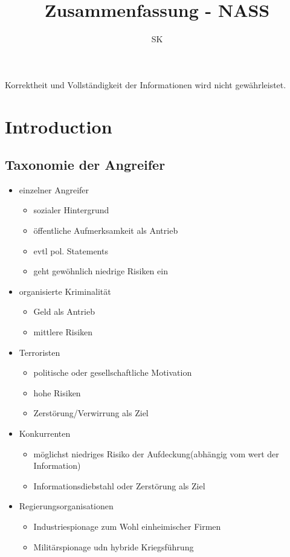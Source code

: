 \documentclass{article} %
\title{Zusammenfassung - NASS}
\author{
	SK
}
\begin{document}
\maketitle
\begin{framed}
	Korrektheit und Vollständigkeit der Informationen wird nicht gewährleistet.
\end{framed}
\setcounter{tocdepth}{1}
\tableofcontents

\section{Introduction}
\subsection{Taxonomie der Angreifer}
\begin{itemize}
	\item einzelner Angreifer
    
    \begin{itemize}
        \item sozialer Hintergrund
        \item öffentliche Aufmerksamkeit als Antrieb
        \item evtl pol. Statements
        \item geht gewöhnlich niedrige Risiken ein
    \end{itemize}
    \item organisierte Kriminalität
    
    \begin{itemize}
        \item Geld als Antrieb
        \item mittlere Risiken
    \end{itemize}
    \item Terroristen
    
    \begin{itemize}
        \item politische oder gesellschaftliche Motivation
        \item hohe Risiken
        \item Zerstörung/Verwirrung als Ziel
    \end{itemize}
    
    \item Konkurrenten
    
    
    \begin{itemize}
        \item möglichst niedriges Risiko der Aufdeckung(abhängig vom wert der Information)
        \item Informationsdiebstahl oder Zerstörung als Ziel
    \end{itemize}
    
    \item Regierungsorganisationen
    
    
    \begin{itemize}
        \item Industriespionage zum Wohl einheimischer Firmen
        \item Militärspionage udn hybride Kriegsführung
    \end{itemize}
\end{itemize}
\end{document}
